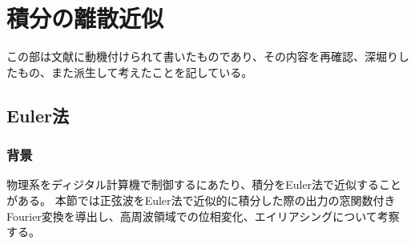 \chapter{積分の離散近似}
    この部は文献\cite{digital-servo}に動機付けられて書いたものであり、その内容を再確認、深堀りしたもの、また派生して考えたことを記している。
    \section{Euler法}
        \subsection{背景}
            物理系をディジタル計算機で制御するにあたり、積分をEuler法で近似することがある。
            本節では正弦波をEuler法で近似的に積分した際の出力の窓関数付きFourier変換を導出し、高周波領域での位相変化、エイリアシングについて考察する。
